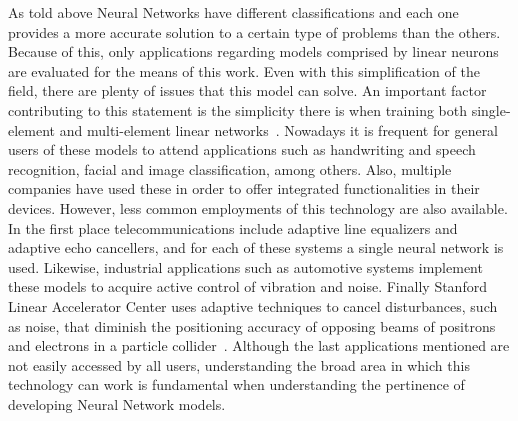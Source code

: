 As told above Neural Networks have different classifications and each one provides a more accurate solution to a certain type of problems than the others. Because of this, only applications regarding models comprised by linear neurons are evaluated for the means of this work. Even with this simplification of the field, there are plenty of issues that this model can solve. An important factor contributing to this statement is the simplicity there is when training both single-element and multi-element linear networks~\cite{widrow94}. Nowadays it is frequent for general users of these models to attend applications such as handwriting and speech recognition, facial and image classification, among others. Also, multiple companies have used these in order to offer integrated functionalities in their devices. However, less common employments of this technology are also available. In the first place telecommunications include adaptive line equalizers and adaptive echo cancellers, and for each of these systems a single neural network is used. Likewise, industrial applications such as automotive systems implement these models to acquire active control of vibration and noise. Finally Stanford Linear Accelerator Center uses adaptive techniques to cancel disturbances, such as noise, that diminish the positioning accuracy of opposing beams of positrons and electrons in a particle collider~\cite{widrow94}. Although the last applications mentioned are not easily accessed by all users, understanding the broad area in which this technology can work is fundamental when understanding the pertinence of developing Neural Network models. 


\endinput

